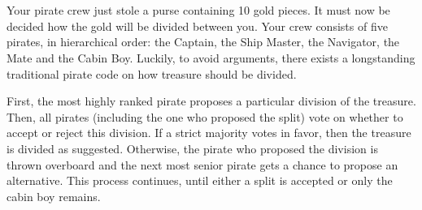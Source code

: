 \documentclass{ape}
\begin{document}
\begin{center}
\end{center}

\nosolution

\section{}
Your pirate crew just stole a purse containing 10 gold pieces. It must now be decided how the gold will be divided between you. Your crew consists of five pirates, in hierarchical order: the Captain, the Ship Master, the Navigator, the Mate and the Cabin Boy. Luckily, to avoid arguments, there exists a longstanding traditional pirate code on how treasure should be divided.

First, the most highly ranked pirate proposes a particular division of the treasure. Then, all pirates (including the one who proposed the split) vote on whether to accept or reject this division. If a strict majority votes in favor, then the treasure is divided as suggested. Otherwise, the pirate who proposed the division is thrown overboard and the next most senior pirate gets a chance to propose an alternative. This process continues, until either a split is accepted or only the cabin boy remains.
\end{document}
